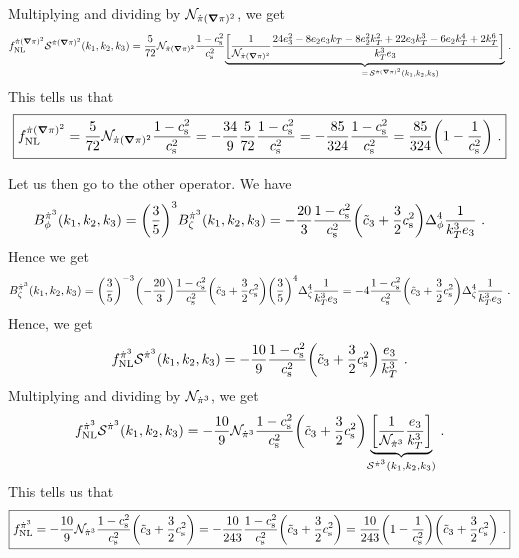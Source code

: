 \documentclass[aps,prd,amsmath,floats,floatfix,superscriptaddress,nofootinbib%
]{revtex4}%
\renewcommand\({\left(}
\renewcommand\){\right)}
\renewcommand\[{\left[}
\renewcommand\]{\right]}
\renewcommand{\vec}{\bm}
\begin{document}
Multiplying and dividing by ${\cal N}_{\dot{\pi}(\vec{\nabla}\pi)^2}$, we get 
\begin{equation}
f_{\rm NL}^{\dot{\pi}(\vec{\nabla}\pi)^2} {\cal S}^{\dot{\pi}(\vec{\nabla}\pi)^2}(k_1,k_2,k_3) = \frac{5}{72}{\cal N}_{\dot{\pi}(\vec{\nabla}\pi)^2}\frac{1-c^2_{\rm s}}{c^2_{\rm s}}{\underbrace{\bigg[\frac{1}{{\cal N}_{\dot{\pi}(\vec{\nabla}\pi)^2}} 
\frac{24e_3^2-8e_2e_3k_T-8e_2^2k_T^2+22e_3k_T^3-6e_2k_T^4+2k_T^6}{k_T^3 e_3}\bigg]}_{\hphantom{{\cal S}^{\dot{\pi}(\vec{\nabla}\pi)^2}(k_1,k_2,k_3)\,}=\,{\cal S}^{\dot{\pi}(\vec{\nabla}\pi)^2}(k_1,k_2,k_3)}}\,\,. 
\end{equation} 
This tells us that 
\begin{equation}
\boxed{f_{\rm NL}^{\dot{\pi}(\vec{\nabla}\pi)^2} = \frac{5}{72}{\cal N}_{\dot{\pi}(\vec{\nabla}\pi)^2}\frac{1-c^2_{\rm s}}{c^2_{\rm s}} = 
{-\frac{34}{9}}\frac{5}{72}\frac{1-c^2_{\rm s}}{c^2_{\rm s}} = {-\frac{85}{324}}\frac{1-c^2_{\rm s}}{c^2_{\rm s}} = \frac{85}{324}\bigg(1-\frac{1}{c^2_{\rm s}}\bigg)\,\,.} 
\end{equation} 

Let us then go to the other operator. We have 
\begin{equation}
B_\phi^{\dot{\pi}^3}(k_1,k_2,k_3) = \bigg(\frac{3}{5}\bigg)^3B_\zeta^{\dot{\pi}^3}(k_1,k_2,k_3) = {-\frac{20}{3}}\frac{1-c^2_{\rm s}}{c^2_{\rm s}}\bigg(\tilde{c}_3+\frac{3}{2}c^2_{\rm s}\bigg)\Delta^4_\phi\frac{1}{k_T^3e_3}\,\,. 
\end{equation}
Hence we get 
\begin{equation}
B_\zeta^{\dot{\pi}^3}(k_1,k_2,k_3) = \bigg(\frac{3}{5}\bigg)^{-3}\bigg({-\frac{20}{3}}\bigg)\frac{1-c^2_{\rm s}}{c^2_{\rm s}}\bigg(\tilde{c}_3+\frac{3}{2}c^2_{\rm s}\bigg)\bigg(\frac{3}{5}\bigg)^{4}\Delta^4_\zeta\frac{1}{k_T^3e_3} = {-4}\frac{1-c^2_{\rm s}}{c^2_{\rm s}}\bigg(\tilde{c}_3+\frac{3}{2}c^2_{\rm s}\bigg)\Delta^4_\zeta\frac{1}{k_T^3e_3}\,\,. 
\end{equation} 
Hence, we get 
\begin{equation}
f_{\rm NL}^{\dot{\pi}^3} {\cal S}^{\dot{\pi}^3}(k_1,k_2,k_3) = {-\frac{10}{9}}\frac{1-c^2_{\rm s}}{c^2_{\rm s}}\bigg(\tilde{c}_3+\frac{3}{2}c^2_{\rm s}\bigg) \frac{e_3}{k_T^3} \,\,. 
\end{equation} 
Multiplying and dividing by ${\cal N}_{\dot{\pi}^3}$, we get 
\begin{equation}
f_{\rm NL}^{\dot{\pi}^3} {\cal S}^{\dot{\pi}^3}(k_1,k_2,k_3) = {-\frac{10}{9}}{\cal N}_{\dot{\pi}^3}\frac{1-c^2_{\rm s}}{c^2_{\rm s}}\bigg(\tilde{c}_3+\frac{3}{2}c^2_{\rm s}\bigg) {\underbrace{\bigg[\frac{1}{{\cal N}_{\dot{\pi}^3}}\frac{e_3}{k_T^3}\bigg]}_{{\cal S}^{\dot{\pi}^3}(k_1,k_2,k_3)}}\,\,. 
\end{equation} 
This tells us that 
\begin{equation}
\boxed{f_{\rm NL}^{\dot{\pi}^3} = {-\frac{10}{9}}{\cal N}_{\dot{\pi}^3}\frac{1-c^2_{\rm s}}{c^2_{\rm s}}\bigg(\tilde{c}_3+\frac{3}{2}c^2_{\rm s}\bigg) = 
{-\frac{10}{243}}\frac{1-c^2_{\rm s}}{c^2_{\rm s}}\bigg(\tilde{c}_3+\frac{3}{2}c^2_{\rm s}\bigg) = 
{\frac{10}{243}}\bigg(1-\frac{1}{c^2_{\rm s}}\bigg)\bigg(\tilde{c}_3+\frac{3}{2}c^2_{\rm s}\bigg)\,\,.} 
\end{equation} 
\end{document}
